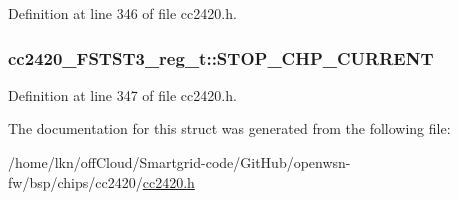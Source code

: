 Definition at line 346 of file cc2420.\+h.

\subsubsection[{\texorpdfstring{S\+T\+O\+P\+\_\+\+C\+H\+P\+\_\+\+C\+U\+R\+R\+E\+NT}{STOP_CHP_CURRENT}}]{ cc2420\+\_\+\+F\+S\+T\+S\+T3\+\_\+reg\+\_\+t\+::\+S\+T\+O\+P\+\_\+\+C\+H\+P\+\_\+\+C\+U\+R\+R\+E\+NT}\hypertarget{structcc2420___f_s_t_s_t3__reg__t_a9b22ea5d1fb50097de185de92d931339}{}\label{structcc2420___f_s_t_s_t3__reg__t_a9b22ea5d1fb50097de185de92d931339}


Definition at line 347 of file cc2420.\+h.



The documentation for this struct was generated from the following file\+:\begin{DoxyCompactItemize}
\item 
/home/lkn/off\+Cloud/\+Smartgrid-\/code/\+Git\+Hub/openwsn-\/fw/bsp/chips/cc2420/\hyperlink{cc2420_8h}{cc2420.\+h}\end{DoxyCompactItemize}
